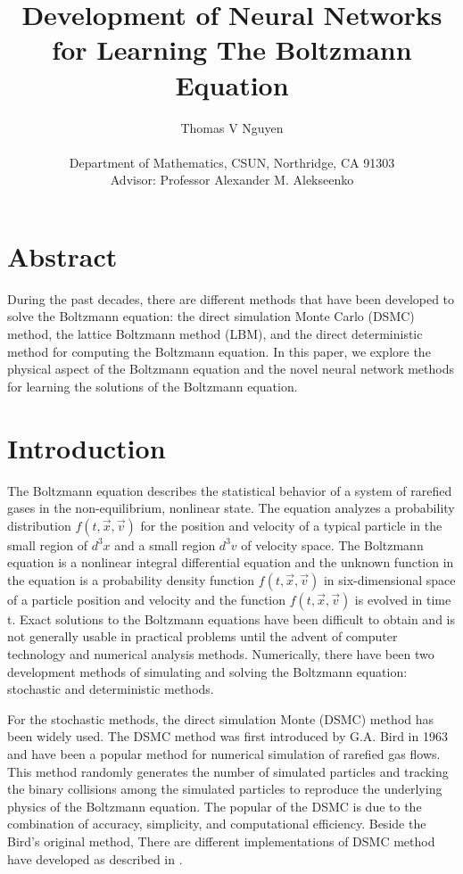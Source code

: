 \documentclass{article}
\title{Development of Neural Networks for Learning The Boltzmann Equation	 }
\author{Thomas V Nguyen \\ \\ Department of Mathematics, CSUN, Northridge, CA 91303 \\
	Advisor: Professor Alexander M. Alekseenko
}
\date{}
\begin{document}
\begin{titlepage}
	\maketitle
\end{titlepage}

\section*{Abstract} During the past decades, there are different methods that have been developed to solve the Boltzmann equation: the direct simulation Monte Carlo (DSMC) method, the lattice Boltzmann method (LBM), and the direct deterministic method for computing the Boltzmann equation. In this paper, we explore the physical aspect of the Boltzmann equation and the novel neural network methods for learning the solutions of the Boltzmann equation.
\section{Introduction} \label{Intro}
The Boltzmann equation describes the statistical behavior of a system of rarefied gases in the non-equilibrium, nonlinear state. The equation analyzes a probability distribution $f(t,\vec{x}, \vec{v})$ for the position and velocity of a typical particle in the small region of $d^3x$ and a small region $d^3v$ of velocity space. The Boltzmann equation is a nonlinear integral differential equation and the unknown function in the equation is a probability density function $f(t,\vec{x}, \vec{v})$ in six-dimensional space of a particle position and velocity and the function $f(t,\vec{x}, \vec{v})$ is evolved in time t. Exact solutions to the Boltzmann equations have been difficult to obtain and is not generally usable in practical problems until the advent of computer technology and numerical analysis methods. Numerically, there have been two development methods of simulating and solving the Boltzmann equation: stochastic and deterministic methods. 

For the stochastic methods, the direct simulation Monte (DSMC) method has been widely used. The DSMC method was first introduced by G.A. Bird in 1963 \cite{BirdGA1} and have been a popular method for numerical simulation of rarefied gas flows. This method randomly generates the number of simulated particles and tracking the binary collisions among the simulated particles to reproduce the underlying physics of the Boltzmann equation. The popular of the DSMC is due to the combination of accuracy, simplicity, and computational efficiency. Beside the Bird’s original method, There are different implementations of DSMC method have developed as described in \cite{DSMC1, DSMC2, DSMC3}. 
\end{document}
